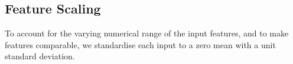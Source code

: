 \subsection{Feature Scaling}
To account for the varying numerical range of the input features, and to make features comparable, we standardise each input to a zero mean with a unit standard deviation.
